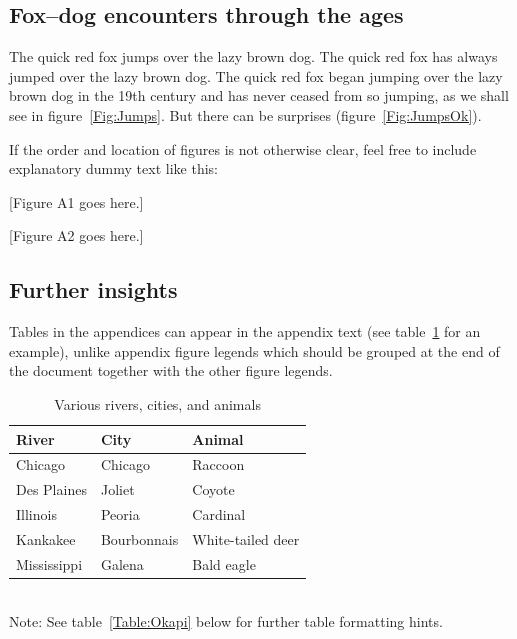 \documentclass[11pt]{article}
\begin{document}
\renewcommand{\theequation}{A\arabic{equation}}
\renewcommand{\thetable}{A\arabic{table}}
\setcounter{equation}{0}  %
\setcounter{figure}{0}
\setcounter{table}{0}

\subsection*{Fox--dog encounters through the ages}

The quick red fox jumps over the lazy brown dog. The quick red fox has always jumped over the lazy brown dog. The quick red fox began jumping over the lazy brown dog in the 19th century and has never ceased from so jumping, as we shall see in figure~\ref{Fig:Jumps}. But there can be surprises (figure~\ref{Fig:JumpsOk}).

If the order and location of figures is not otherwise clear, feel free to include explanatory dummy text like this:

[Figure A1 goes here.]

[Figure A2 goes here.]

\subsection*{Further insights}

Tables in the appendices can appear in the appendix text (see table~\ref{Table:Rivers} for an example), unlike appendix figure legends which should be grouped at the end of the document together with the other figure legends.

\begin{table}[h]
\caption{Various rivers, cities, and animals}
\label{Table:Rivers}
\centering
\begin{tabular}{lll}\hline
River        & City        & Animal            \\ \hline
Chicago      & Chicago     & Raccoon           \\
Des Plaines  & Joliet      & Coyote            \\
Illinois     & Peoria      & Cardinal          \\
Kankakee     & Bourbonnais & White-tailed deer \\
Mississippi  & Galena      & Bald eagle        \\ \hline
\end{tabular}
\bigskip{}
\\
{\footnotesize Note: See table~\ref{Table:Okapi} below for further table formatting hints.}
\end{table}
\end{document}
